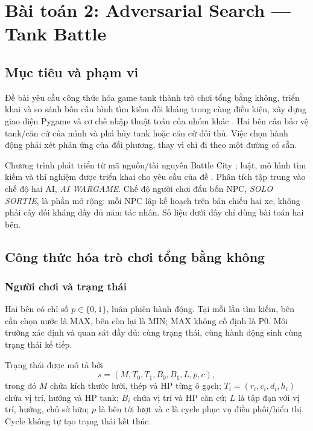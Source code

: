 \section{Bài toán 2: Adversarial Search --- Tank Battle}
\label{sec:task2}

\subsection{Mục tiêu và phạm vi}
Đề bài yêu cầu công thức hóa game tank thành trò chơi tổng bằng không,
triển khai và so sánh bốn cấu hình tìm kiếm đối kháng trong cùng điều
kiện, xây dựng giao diện Pygame và cơ chế nhập thuật toán của nhóm khác
\cite{assignment}. Hai bên cần bảo vệ tank/căn cứ của mình và phá hủy
tank hoặc căn cứ đối thủ. Việc chọn hành động phải xét phản ứng của
đối phương, thay vì chỉ đi theo một đường có sẵn.

Chương trình phát triển từ mã nguồn/tài nguyên Battle City
\cite{battlecity}; luật, mô hình tìm kiếm và thí nghiệm được triển khai
cho yêu cầu của đề \cite{project}. Phân tích tập trung vào chế độ hai
AI, \emph{AI WARGAME}. Chế độ người chơi đấu bốn NPC, \emph{SOLO SORTIE},
là phần mở rộng: mỗi NPC lập kế hoạch trên bản chiếu hai xe, không phải
cây đối kháng đầy đủ năm tác nhân. Số liệu dưới đây chỉ dùng bài toán
hai bên.

\subsection{Công thức hóa trò chơi tổng bằng không}
\subsubsection{Người chơi và trạng thái}
Hai bên có chỉ số $p\in\{0,1\}$, luân phiên hành động. Tại mỗi lần tìm
kiếm, bên cần chọn nước là MAX, bên còn lại là MIN; MAX không cố định
là P0. Môi trường xác định và quan sát đầy đủ: cùng trạng thái, cùng
hành động sinh cùng trạng thái kế tiếp.

Trạng thái được mô tả bởi
\begin{equation}
s=(M,T_0,T_1,B_0,B_1,L,p,c),
\label{t2:eq:state}
\end{equation}
trong đó $M$ chứa kích thước lưới, thép và HP từng ô gạch;
$T_i=(r_i,c_i,d_i,h_i)$ chứa vị trí, hướng và HP tank; $B_i$ chứa vị trí
và HP căn cứ; $L$ là tập đạn với vị trí, hướng, chủ sở hữu; $p$ là bên
tới lượt và $c$ là cycle phục vụ điều phối/hiển thị. Cycle không tự
tạo trạng thái kết thúc.

